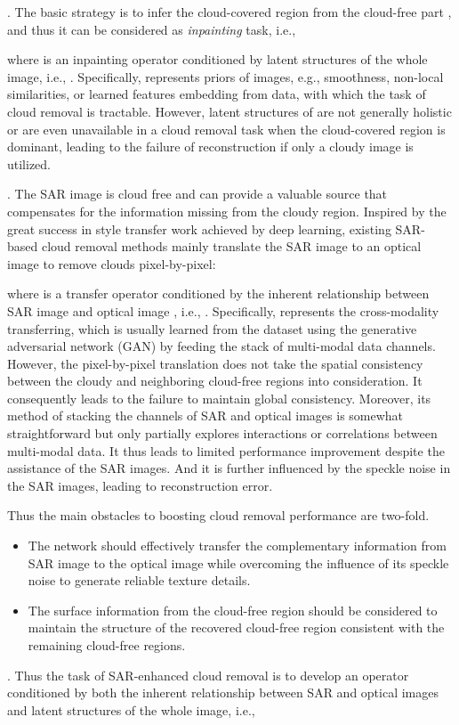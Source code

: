 \documentclass[a4paper,fleqn]{cas-dc}
\newcommand{\ie}[1]{{i.e.}}
\begin{document}
. The basic strategy is to infer the cloud-covered region  from the cloud-free part , and thus it can be considered as {\it inpainting} task, \ie{},

where  is an inpainting operator conditioned by latent structures of the whole image, \ie{}, . Specifically,  represents priors of images, e.g., smoothness, non-local similarities, or learned features embedding from data, with which the task of cloud removal is tractable. However, latent structures of  are not generally holistic or are even unavailable in a cloud removal task when the cloud-covered region is dominant, leading to the failure of reconstruction if only a cloudy image  is utilized.









. The SAR image  is cloud free and can provide a valuable source that compensates for the information missing from the cloudy region. Inspired by the great success in style transfer work achieved by deep learning, existing SAR-based cloud removal methods mainly translate the SAR image to an optical image to remove clouds pixel-by-pixel:

where  is a transfer operator conditioned by the inherent relationship between SAR image  and optical image , \ie{}, . Specifically,  represents the cross-modality transferring, which is usually learned from the dataset using the generative adversarial network (GAN) by feeding the stack of multi-modal data channels. 
However, the pixel-by-pixel translation does not take the spatial consistency between the cloudy and neighboring cloud-free regions into consideration. It consequently leads to the failure to maintain global consistency. Moreover, its method of stacking the channels of SAR and optical images is somewhat straightforward but only partially explores interactions or correlations between multi-modal data. It thus leads to limited performance improvement despite the assistance of the SAR images. And it is further influenced by the speckle noise in the SAR images, leading to reconstruction error. 


Thus the main obstacles to boosting cloud removal performance are two-fold. 
\begin{itemize}
\item The network should effectively transfer the complementary information from SAR image  to the optical image while overcoming the influence of its speckle noise to generate reliable texture details.
	\item The surface information from the cloud-free region  should be considered to maintain the structure of the recovered cloud-free region consistent with the remaining cloud-free regions.
\end{itemize} 
. Thus the task of SAR-enhanced cloud removal is to develop an operator  conditioned by both the inherent relationship between SAR and optical images and latent structures of the whole image, \ie{},
\end{document}
